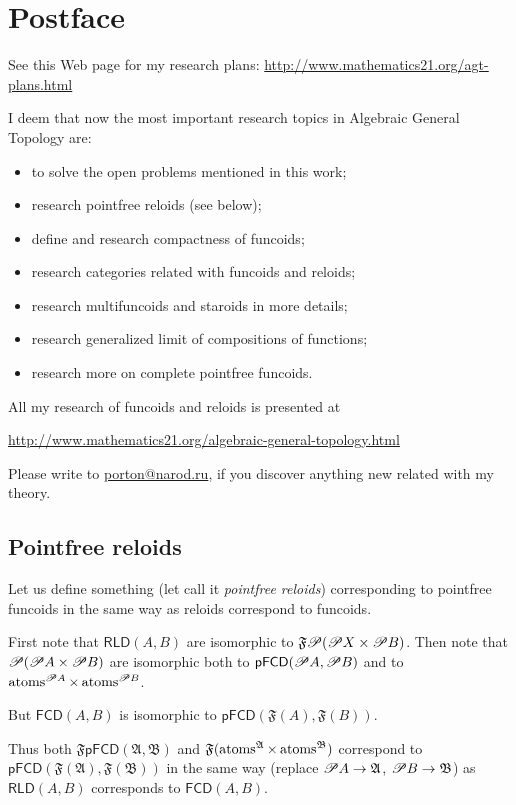 
\chapter{Postface}

See this Web page for my research plans: \href{http://www.mathematics21.org/agt-plans.html}{http://www.mathematics21.org/agt-plans.html}

I deem that now the most important research topics in Algebraic General
Topology are:
\begin{itemize}
\item to solve the open problems mentioned in this work;
\item research pointfree reloids (see below);
\item define and research compactness of funcoids;
\item research categories related with funcoids and reloids;
\item research multifuncoids and staroids in more details;
\item research generalized limit of compositions of functions;
\item research more on complete pointfree funcoids.
\end{itemize}
All my research of funcoids and reloids is presented at

\href{http://www.mathematics21.org/algebraic-general-topology.html}{http://www.mathematics21.org/algebraic-general-topology.html}

Please write to \href{mailto:porton@narod.ru}{porton@narod.ru}, if
you discover anything new related with my theory.


\section{Pointfree reloids}

Let us define something (let call it \emph{pointfree reloids}) corresponding
to pointfree funcoids in the same way as reloids correspond to funcoids.

First note that $\mathsf{RLD}(A,B)$ are isomorphic to $\mathfrak{F}\mathscr{P}(\mathscr{P} X\times\mathscr{P} B)$.
Then note that $\mathscr{P}(\mathscr{P} A\times\mathscr{P} B)$ are isomorphic
both to $\mathsf{pFCD}(\mathscr{P} A,\mathscr{P} B)$ and to $\operatorname{atoms}^{\mathscr{P} A}\times\operatorname{atoms}^{\mathscr{P} B}$.

But $\mathsf{FCD}(A,B)$ is isomorphic to $\mathsf{pFCD}(\mathfrak{F}(A),\mathfrak{F}(B))$.

Thus both $\mathfrak{F}\mathsf{pFCD}(\mathfrak{A},\mathfrak{B})$
and $\mathfrak{F}(\operatorname{atoms}^{\mathfrak{A}}\times\operatorname{atoms}^{\mathfrak{B}})$
correspond to $\mathsf{pFCD}(\mathfrak{F}(\mathfrak{A}),\mathfrak{F}(\mathfrak{B}))$
in the same way (replace $\mathscr{P} A\rightarrow\mathfrak{A}$, $\mathscr{P} B\rightarrow\mathfrak{B}$)
as $\mathsf{RLD}(A,B)$ corresponds to $\mathsf{FCD}(A,B)$.

